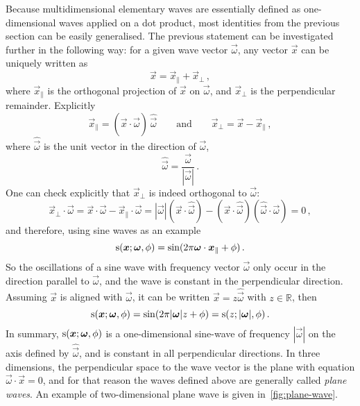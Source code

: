 Because multidimensional elementary waves are essentially defined as one-dimensional waves
applied on a dot product, most identities from the previous section can be easily
generalised. The previous statement can be investigated further in the following way: for
a given wave vector $\vec{\omega}$, any vector $\vec{x}$ can be uniquely written as
\begin{equation}
  \vec{x}=\vec{x}_{\parallel}+\vec{x}_{\perp}\,,
\end{equation}
where $\vec{x}_{\parallel}$ is the orthogonal projection of $\vec{x}$ on $\vec{\omega}$,
and $\vec{x}_{\perp}$ is the perpendicular remainder. Explicitly
\begin{equation}
  \vec{x}_{\parallel}=(\vec{x}\cdot\hat{\vec{\omega}})\,\hat{\vec{\omega}}
  \qquad\text{and}\qquad
  \vec{x}_{\perp}=\vec{x}-\vec{x}_{\parallel}\,,
\end{equation}
where $\hat{\vec{\omega}}$ is the unit vector in the direction of $\vec{\omega}$, \ie
\begin{equation}
  \hat{\vec{\omega}}=\frac{\vec{\omega}}{|\vec{\omega}|}\,.
\end{equation}
One can check explicitly that $\vec{x}_{\perp}$ is indeed orthogonal to $\vec{\omega}$:
\begin{equation}
  \vec{x}_{\perp}\cdot\vec{\omega}
  =\vec{x}\cdot\vec{\omega}-\vec{x}_{\parallel}\cdot\vec{\omega}
  =|\vec{\omega}|(\vec{x}\cdot\hat{\vec{\omega}})
  -(\vec{x}\cdot\hat{\vec{\omega}})(\hat{\vec{\omega}}\cdot\vec{\omega})=0\,,
\end{equation}
and therefore, using sine waves as an example
\begin{equation}
  \operatorname{s}(\bm{x};\bm{\omega},\phi)=\sin(2\pi\bm{\omega}\cdot\bm{x}_{\parallel}+\phi)\,.
\end{equation}
So the oscillations of a sine wave with frequency vector $\vec{\omega}$ only occur in the
direction parallel to $\vec{\omega}$, and the wave is constant in the perpendicular
direction. Assuming $\vec{x}$ is aligned with $\vec{\omega}$, \ie it can be written
$\vec{x}=z\hat{\vec{\omega}}$ with $z\in\mathbb{R}$, then
\begin{equation}
  \operatorname{s}(\bm{x};\bm{\omega},\phi)=\sin(2\pi|\bm{\omega}|z+\phi)=\operatorname{s}(z;|\bm{\omega}|,\phi)\,.
\end{equation}
In summary, $\operatorname{s}(\bm{x};\bm{\omega},\phi)$ is a one-dimensional sine-wave of frequency
$|\vec{\omega}|$ on the axis defined by $\hat{\vec{\omega}}$, and is constant in all
perpendicular directions. In three dimensions, the perpendicular space to the wave vector
is the plane with equation $\vec{\omega}\cdot\vec{x}=0$, and for that reason the waves
defined above are generally called \emph{plane waves}. An example of two-dimensional plane
wave is given in~\cref{fig:plane-wave}.

